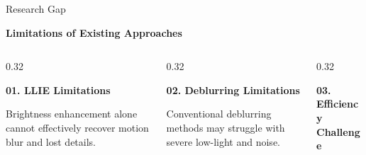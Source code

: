 \documentclass[
    11pt,%
    aspectratio=169,%
]{beamer}
\begin{document}
\begin{frame}{Research Gap}

\small


{\color{Navy}\bfseries
Limitations of Existing Approaches}

\vspace{0.15cm}

\begin{columns}[T,onlytextwidth]

    \begin{column}{0.32\textwidth}
        \begin{beamercolorbox}[
            rounded=true,
            sep=0.12cm,
            wd=\textwidth,
            ht=2.05cm
        ]{}
            {\color{orange!85!black}
            \bfseries 01. LLIE Limitations}

            \vspace{0.1cm}

            \fontsize{8.5}{10.5}\selectfont

            Brightness enhancement alone cannot effectively recover motion blur and lost details.
            \vspace{0.08cm}
        \end{beamercolorbox}
    \end{column}

    \begin{column}{0.32\textwidth}
        \begin{beamercolorbox}[
            rounded=true,
            sep=0.12cm,
            wd=\textwidth,
            ht=2.05cm
        ]{}
            {\color{orange!85!black}
            \bfseries 02. Deblurring Limitations}

            \vspace{0.1cm}

            Conventional deblurring methods may struggle with severe low-light and noise.

            \vspace{0.08cm}
        \end{beamercolorbox}
    \end{column}

    \begin{column}{0.32\textwidth}
        \begin{beamercolorbox}[
            rounded=true,
            sep=0.12cm,
            wd=\textwidth,
            ht=2.05cm
        ]{}
            {\color{orange!85!black}
            \bfseries 03. Efficiency Challenge}


\end{beamercolorbox}
\end{column}
\end{columns}
\end{frame}
\end{document}
